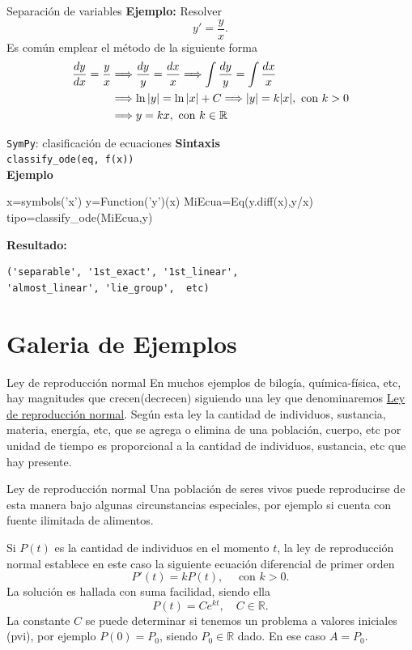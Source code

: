 \documentclass[handout,hyperref={colorlinks=true}]{beamer}
\newcommand{\rr}{\mathbb{R}}
\newcommand{\nl}{\onslide<+-> }
\begin{document}
\begin{frame}{Separación de variables} 
\textbf{Ejemplo:} Resolver
\[y'=\frac{y}{x}.\]
Es común emplear el método de la siguiente forma
\[\begin{split}
   \frac{dy}{dx}=\frac{y}{x} &\Longrightarrow \frac{dy}{y}=\frac{dx}{x} \Longrightarrow \int \frac{dy}{y}=\int \frac{dx}{x}\\
   &\Longrightarrow\ln|y|=\ln|x|+C \Longrightarrow |y|= k|x|, \hbox{ con }k>0\\
   &\Longrightarrow y= kx, \hbox{ con }k\in\rr
  \end{split}
\]

\end{frame}


\begin{frame}[fragile]{\texttt{SymPy}: clasificación de ecuaciones} 
\textbf{Sintaxis}\\
\texttt{classify\_ode(eq, f(x))}\\
\textbf{Ejemplo}
\begin{sageblock}
x=symbols('x')
y=Function('y')(x)
MiEcua=Eq(y.diff(x),y/x)
tipo=classify_ode(MiEcua,y)
\end{sageblock}
\textbf{Resultado:}\\
\begin{verbatim}
('separable', '1st_exact', '1st_linear', 
'almost_linear', 'lie_group',  etc)
\end{verbatim}


\end{frame}

\section{Galeria de Ejemplos}

\begin{frame}{Ley de reproducción normal}
\nl  En muchos ejemplos de bilogía, química-física, etc, hay magnitudes que crecen(decrecen) siguiendo una ley que denominaremos 
\href{http://es.wikipedia.org/wiki/Crecimiento_exponencial}{Ley de reproducción  normal}. Según esta ley la cantidad de individuos, sustancia, materia,
energía, etc, que se agrega o elimina de una población, cuerpo, etc por unidad de tiempo es proporcional a la cantidad de individuos, sustancia, etc que hay presente.

\end{frame}

\begin{frame}{Ley de reproducción normal}
\nl  Una población de seres vivos puede reproducirse de esta manera bajo algunas circunstancias 
especiales, por ejemplo si cuenta con fuente ilimitada de alimentos.

\nl  Si $P(t)$ es la cantidad de individuos en el momento $t$, la ley de reproducción normal establece
en este caso la siguiente ecuación diferencial de primer orden
\[P'(t)=kP(t),\quad\text{ con } k>0.\]
La solución es hallada con suma facilidad, siendo ella 
\[\boxed{P(t)=Ce^{kt},\quad C\in\rr.}\]
La constante  $C$ se puede determinar si tenemos un problema a valores iniciales (pvi), por ejemplo $P(0)=P_0$, siendo $P_0\in\rr$ dado. En ese caso
$A=P_0$. 
\end{frame}
\end{document}
